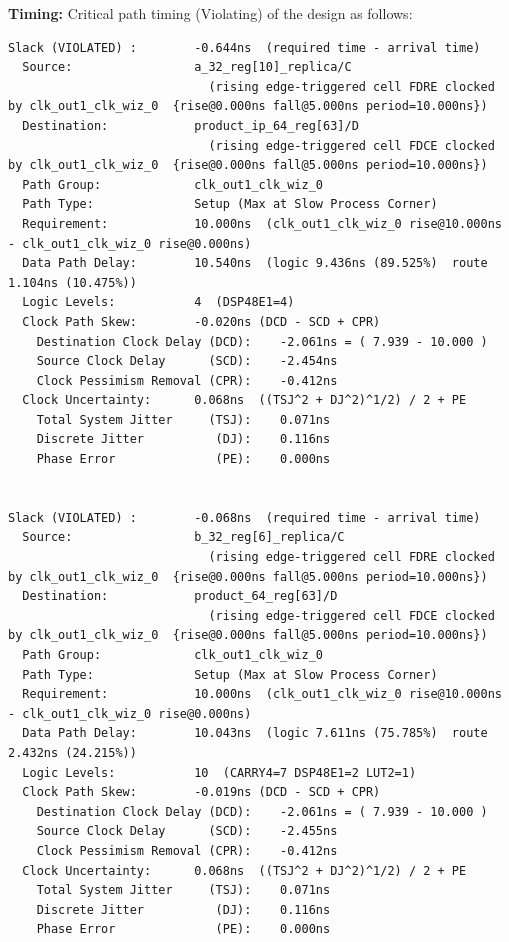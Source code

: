 \documentclass{report}
\begin{document}
\textbf{Timing:}
Critical path timing (Violating) of the design as follows:

\begin{verbatim}
Slack (VIOLATED) :        -0.644ns  (required time - arrival time)
  Source:                 a_32_reg[10]_replica/C
                            (rising edge-triggered cell FDRE clocked by clk_out1_clk_wiz_0  {rise@0.000ns fall@5.000ns period=10.000ns})
  Destination:            product_ip_64_reg[63]/D
                            (rising edge-triggered cell FDCE clocked by clk_out1_clk_wiz_0  {rise@0.000ns fall@5.000ns period=10.000ns})
  Path Group:             clk_out1_clk_wiz_0
  Path Type:              Setup (Max at Slow Process Corner)
  Requirement:            10.000ns  (clk_out1_clk_wiz_0 rise@10.000ns - clk_out1_clk_wiz_0 rise@0.000ns)
  Data Path Delay:        10.540ns  (logic 9.436ns (89.525%)  route 1.104ns (10.475%))
  Logic Levels:           4  (DSP48E1=4)
  Clock Path Skew:        -0.020ns (DCD - SCD + CPR)
    Destination Clock Delay (DCD):    -2.061ns = ( 7.939 - 10.000 ) 
    Source Clock Delay      (SCD):    -2.454ns
    Clock Pessimism Removal (CPR):    -0.412ns
  Clock Uncertainty:      0.068ns  ((TSJ^2 + DJ^2)^1/2) / 2 + PE
    Total System Jitter     (TSJ):    0.071ns
    Discrete Jitter          (DJ):    0.116ns
    Phase Error              (PE):    0.000ns

    
Slack (VIOLATED) :        -0.068ns  (required time - arrival time)
  Source:                 b_32_reg[6]_replica/C
                            (rising edge-triggered cell FDRE clocked by clk_out1_clk_wiz_0  {rise@0.000ns fall@5.000ns period=10.000ns})
  Destination:            product_64_reg[63]/D
                            (rising edge-triggered cell FDCE clocked by clk_out1_clk_wiz_0  {rise@0.000ns fall@5.000ns period=10.000ns})
  Path Group:             clk_out1_clk_wiz_0
  Path Type:              Setup (Max at Slow Process Corner)
  Requirement:            10.000ns  (clk_out1_clk_wiz_0 rise@10.000ns - clk_out1_clk_wiz_0 rise@0.000ns)
  Data Path Delay:        10.043ns  (logic 7.611ns (75.785%)  route 2.432ns (24.215%))
  Logic Levels:           10  (CARRY4=7 DSP48E1=2 LUT2=1)
  Clock Path Skew:        -0.019ns (DCD - SCD + CPR)
    Destination Clock Delay (DCD):    -2.061ns = ( 7.939 - 10.000 ) 
    Source Clock Delay      (SCD):    -2.455ns
    Clock Pessimism Removal (CPR):    -0.412ns
  Clock Uncertainty:      0.068ns  ((TSJ^2 + DJ^2)^1/2) / 2 + PE
    Total System Jitter     (TSJ):    0.071ns
    Discrete Jitter          (DJ):    0.116ns
    Phase Error              (PE):    0.000ns
\end{verbatim}
\end{document}
